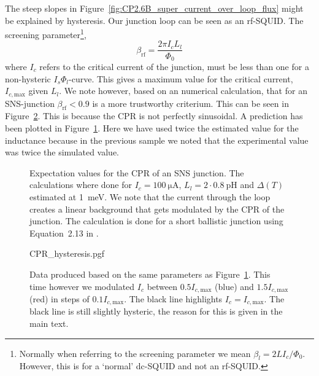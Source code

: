 The steep slopes in Figure~\ref{fig:CP2.6B_super_current_over_loop_flux} might be explained by hysteresis. Our junction loop can be seen as an rf-SQUID.\cite{clarkeSQUIDHandbook2004} The screening parameter\footnote{Normally when referring to the screening parameter we mean $\beta_l = 2LI_c/\Phi_0$. However, this is for a `normal' dc-SQUID and not an rf-SQUID.},
\begin{equation}
	\beta_{\text{rf}} = \frac{2\pi I_c L_l}{\Phi_0}
\end{equation}
where $I_c$ refers to the critical current of the junction, must be less than one for a non-hysteric $I_s\Phi_l$-curve\cite{clarkeSQUIDHandbook2004,frolovMeasurementCurrentPhaseRelation2004}. This gives a maximum value for the critical current, $I_{c,\text{max}}$ given $L_l$. We note however, based on an numerical calculation, that for an SNS-junction $\beta_{\text{rf}} < 0.9$ is a more trustworthy criterium. This can be seen in Figure~\ref{fig:CPR-hysteresis}. This is because the CPR is not perfectly sinusoidal\cite{vermeerSTMbasedScanningSQUID2021,likharevSuperconductingWeakLinks1979}. A prediction has been plotted in Figure~\ref{fig:CP3.5A-analytical-prediction}. Here we have used twice the estimated value for the inductance because in the previous sample we noted that the experimental value was twice the simulated value.

\begin{figure}[ht!]
	\centering
	
	\caption{Expectation values for the CPR of an SNS junction. The calculations where done for $I_c=\qty{100}{\micro\ampere}$, $L_l=2 \cdot \qty{0.8}{\pico\henry}$ and $\Delta(T)$ estimated at \qty{1}{\milli\electronvolt}. We note that the current through the loop creates a linear background that gets modulated by the CPR of the junction. The calculation is done for a short ballistic junction using Equation~2.13 in \cite{vermeerSTMbasedScanningSQUID2021}.}
	\label{fig:CP3.5A-analytical-prediction}
\end{figure}

\begin{figure}
	\centering
	{CPR_hysteresis.pgf}
	\caption{Data produced based on the same parameters as Figure~\ref{fig:CP3.5A-analytical-prediction}. This time however we modulated $I_c$ between $0.5I_{c,\text{max}}$ (blue) and $1.5I_{c,\text{max}}$ (red) in steps of $0.1I_{c,\text{max}}$. The black line highlights $I_c=I_{c,\text{max}}$. The black line is still slightly hysteric, the reason for this is given in the main text.}
	\label{fig:CPR-hysteresis}
\end{figure}

